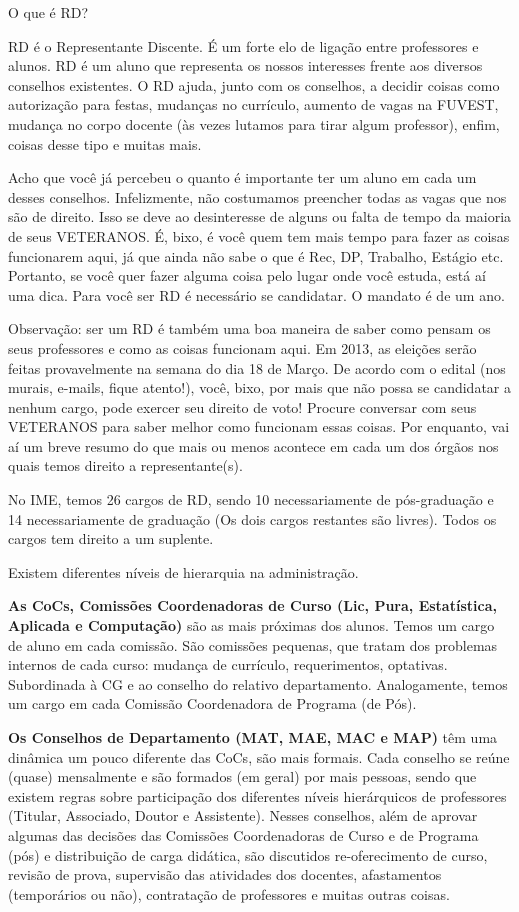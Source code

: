 \begin{secao}{O que é RD?}

RD é o Representante Discente. É um forte elo de ligação entre professores e
alunos. RD é um aluno que representa os nossos interesses frente aos diversos
conselhos existentes. O RD ajuda, junto com os conselhos, a decidir coisas como
autorização para festas, mudanças no currículo, aumento de vagas na FUVEST,
mudança no corpo docente (às vezes lutamos para tirar algum professor), enfim,
coisas desse tipo e muitas mais.

Acho que você já percebeu o quanto é importante ter um aluno em cada um desses
conselhos. Infelizmente, não costumamos preencher todas as vagas que nos são de
direito. Isso se deve ao desinteresse de alguns ou falta de tempo da maioria
de seus VETERANOS. É, bixo, é você quem tem mais tempo para fazer as coisas
funcionarem aqui, já que ainda não sabe o que é Rec, DP, Trabalho, Estágio etc.
Portanto, se você quer fazer alguma coisa pelo lugar onde você estuda, está aí
uma dica. Para você ser RD é necessário se candidatar. O mandato é de um
ano.

Observação: ser um RD é também uma boa maneira de saber como pensam os seus 
professores e como as coisas funcionam aqui.
Em 2013, as eleições serão feitas provavelmente na semana do dia 18 de Março. 
De acordo com o edital (nos murais, e-mails, fique atento!), 
você, bixo, por mais que não possa se candidatar a nenhum cargo, pode exercer
seu direito de voto! Procure conversar com seus VETERANOS para saber melhor
como funcionam essas coisas. Por enquanto, vai aí um breve resumo do que mais
ou menos acontece em cada um dos órgãos nos quais temos direito a
representante(s).

No IME, temos 26 cargos de RD, sendo 10 necessariamente de pós-graduação e 14
necessariamente de graduação (Os dois cargos restantes são livres). Todos os
cargos tem direito a um suplente.

Existem diferentes níveis de hierarquia na administração.

{\bf As CoCs,
Comissões Coordenadoras de Curso (Lic, Pura, Estatística, Aplicada e
Computação)} são as mais próximas dos alunos. Temos um cargo de aluno em cada
comissão. São comissões pequenas, que tratam dos problemas internos de cada
curso: mudança de currículo, requerimentos, optativas. Subordinada à CG e ao
conselho do relativo departamento. Analogamente, temos um cargo em cada
Comissão Coordenadora de Programa (de Pós).

{\bf Os Conselhos de Departamento (MAT, MAE, MAC e MAP)} têm uma dinâmica um
pouco diferente das CoCs, são mais formais. Cada conselho se reúne (quase)
mensalmente e são formados (em geral) por mais pessoas, sendo que existem
regras sobre participação dos diferentes níveis hierárquicos de
professores (Titular, Associado, Doutor e Assistente). Nesses conselhos, além
de aprovar algumas das decisões das Comissões Coordenadoras de Curso e de
Programa (pós) e distribuição de carga didática, são discutidos re-oferecimento
de curso, revisão de prova, supervisão das atividades dos docentes,
afastamentos (temporários ou não), contratação de professores e muitas outras
coisas.


\end{secao}
